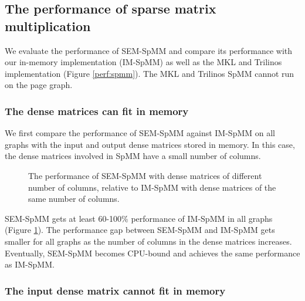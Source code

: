 \subsection{The performance of sparse matrix multiplication}

We evaluate the performance of SEM-SpMM and compare its performance with
our in-memory implementation (IM-SpMM) as well as the MKL and Trilinos
implementation (Figure \ref{perf:spmm}). The MKL and Trilinos SpMM cannot run
on the page graph.

\subsubsection{The dense matrices can fit in memory}

We first compare the performance of SEM-SpMM against IM-SpMM on all graphs with
the input and output dense matrices stored in memory. In this case, the dense
matrices involved in SpMM have a small number of columns.

\begin{figure}
	\begin{center}
		\footnotesize
		
		\caption{The performance of SEM-SpMM with dense matrices of different
			number of columns, relative to IM-SpMM with dense matrices of
		the same number of columns.}
		\label{perf:spmm_comp}
	\end{center}
\end{figure}

%		

SEM-SpMM gets at least 60-100\% performance of IM-SpMM in all graphs (Figure
\ref{perf:spmm_comp}). The performance gap between SEM-SpMM and IM-SpMM gets
smaller for all graphs as the number of columns in the dense matrices increases.
Eventually, SEM-SpMM becomes CPU-bound and achieves the same performance as
IM-SpMM.

\subsubsection{The input dense matrix cannot fit in memory}

